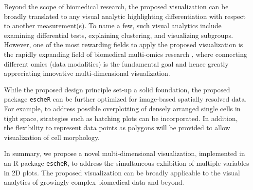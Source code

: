 \documentclass[10pt,twocolumn]{article}
\newcommand{\rr}[1]{{\color{red} #1}}
\begin{document}
Beyond the scope of biomedical research, the proposed visualization can be broadly translated to any visual analytic highlighting differentiation with respect to another measurement(s). To name a few, such visual analytics include examining differential tests,  explaining clustering, and visualizing subgroups. However, one of the most rewarding fields to apply the proposed visualization is the rapidly expanding field of biomedical multi-omics research \cite{hasin_2017}, where connecting different omics (data modalities) is the fundamental goal and hence greatly appreciating innovative multi-dimensional visualization. 

While the proposed design principle set-up a solid foundation, the proposed package \texttt{escheR} can be further optimized for image-based spatially resolved data. For example, to address possible overplotting of densely arranged single cells in tight space, strategies such as hatching plots \cite{patrick2023spatial} can be incorporated. In addition, the flexibility to represent data points as polygons will be provided to allow visualization of cell morphology.

In summary, we propose a novel multi-dimensional visualization, implemented in an R package \texttt{escheR}, to address the simultaneous exhibition of multiple variables in 2D plots. The proposed visualization can be broadly applicable to the visual analytics of growingly complex biomedical data and beyond.










\clearpage
\end{document}
